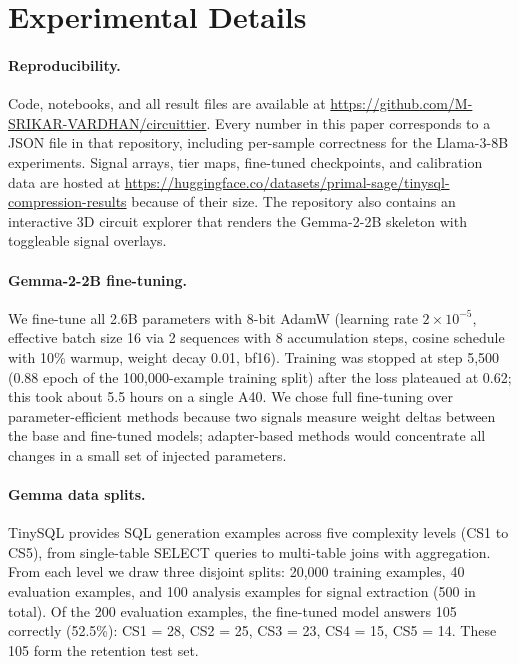 \documentclass[11pt]{article}
\begin{document}


\appendix

\section{Experimental Details}
\label{app:details}

\paragraph{Reproducibility.}
Code, notebooks, and all result files are available at 
\url{https://github.com/M-SRIKAR-VARDHAN/circuittier}. Every number in this paper corresponds to a 
JSON file in that repository, including per-sample correctness 
for the Llama-3-8B experiments. Signal arrays, tier maps, 
fine-tuned checkpoints, and calibration data are hosted at 
\url{https://huggingface.co/datasets/primal-sage/tinysql-compression-results} because of their size. The repository also 
contains an interactive 3D circuit explorer that renders the 
Gemma-2-2B skeleton with toggleable signal overlays.

\paragraph{Gemma-2-2B fine-tuning.}
We fine-tune all 2.6B parameters with 8-bit AdamW (learning 
rate $2{\times}10^{-5}$, effective batch size 16 via 2 sequences 
with 8 accumulation steps, cosine schedule with 10\% warmup, 
weight decay 0.01, bf16). Training was stopped at step 5,500 
(0.88 epoch of the 100,000-example training split) after the 
loss plateaued at 0.62; this took about 5.5 hours on a single 
A40. We chose full fine-tuning over parameter-efficient methods 
because two signals measure weight deltas between the base and 
fine-tuned models; adapter-based methods would concentrate all 
changes in a small set of injected parameters.

\paragraph{Gemma data splits.}
TinySQL provides SQL generation examples across five complexity 
levels (CS1 to CS5), from single-table SELECT queries to 
multi-table joins with aggregation. From each level we draw 
three disjoint splits: 20,000 training examples, 40 evaluation 
examples, and 100 analysis examples for signal extraction (500 
in total). Of the 200 evaluation examples, the fine-tuned model 
answers 105 correctly (52.5\%): CS1 = 28, CS2 = 25, CS3 = 23, 
CS4 = 15, CS5 = 14. These 105 form the retention test set.
\end{document}
